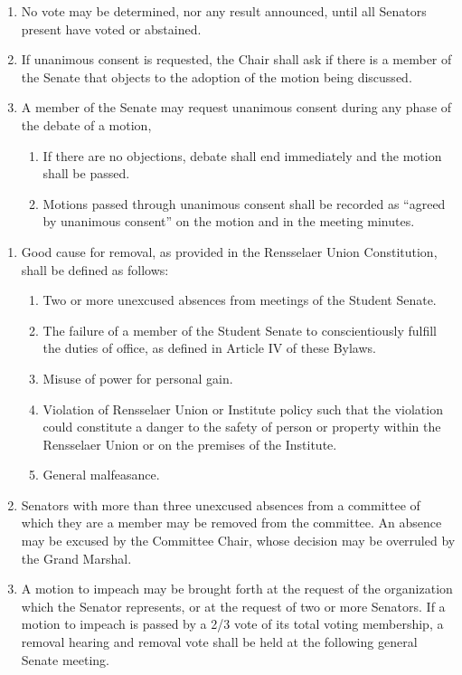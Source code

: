 \begin{enumerate}
\begin{enumerate}
  \item No vote may be determined, nor any result announced, until all Senators present have voted or abstained.
  \item If unanimous consent is requested, the Chair shall ask if there is a member of the Senate that objects to the adoption of the motion being discussed.
  \item A member of the Senate may request unanimous consent during any phase of the debate of a motion,
    \begin{enumerate}
    \item If there are no objections, debate shall end immediately and the motion shall be passed.
    \item Motions passed through unanimous consent shall be recorded as ``agreed by unanimous consent'' on the motion and in the meeting minutes.
    \end{enumerate}
  \end{enumerate}
\end{enumerate}


\begin{enumerate}
\item Good cause for removal, as provided in the Rensselaer Union Constitution, shall be defined as follows:
  \begin{enumerate}
  \item Two or more unexcused absences from meetings of the Student Senate.
  \item The failure of a member of the Student Senate to conscientiously fulfill the duties of office, as defined in Article IV of these Bylaws.
  \item Misuse of power for personal gain.
  \item Violation of Rensselaer Union or Institute policy such that the violation could constitute a danger to the safety of person or property within the Rensselaer Union or on the premises of the Institute.
  \item General malfeasance.
  \end{enumerate}
\item Senators with more than three unexcused absences from a committee of which they are a member may be removed from the committee. An absence may be excused by the Committee Chair, whose decision may be overruled by the Grand Marshal.
\item A motion to impeach may be brought forth at the request of the organization which the Senator represents, or at the request of two or more Senators. If a motion to impeach is passed by a 2/3 vote of its total voting membership, a removal hearing and removal vote shall be held at the following general Senate meeting.
\end{enumerate}

